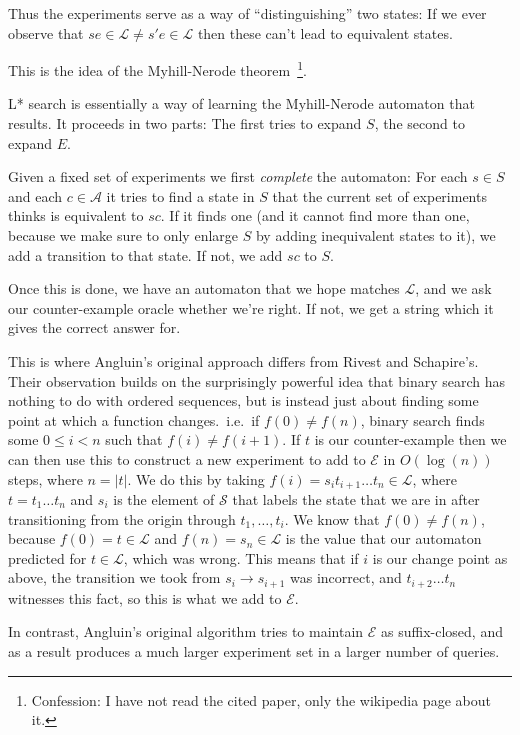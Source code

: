 \documentclass[a4paper]{article}
\begin{document}
Thus the experiments serve as a way of ``distinguishing'' two states:
If we ever observe that \(se \in \mathcal{L} \neq s'e \in \mathcal{L}\) then these can't lead to equivalent states.

This is the idea of the Myhill-Nerode theorem~\cite{nerode1958linear}\footnote{Confession:
I have not read the cited paper,
only the wikipedia page about it.
}.

L* search is essentially a way of learning the Myhill-Nerode automaton that results.
It proceeds in two parts:
The first tries to expand \(S\),
the second to expand \(E\).

Given a fixed set of experiments we first \emph{complete} the automaton:
For each \(s \in S\) and each \(c \in \mathcal{A}\) it tries to find a state in \(S\) that the current set of experiments thinks is equivalent to \(sc\).
If it finds one (and it cannot find more than one,
because we make sure to only enlarge \(S\) by adding inequivalent states to it),
we add a transition to that state.
If not,
we add \(sc\) to \(S\).

Once this is done,
we have an automaton that we hope matches \(\mathcal{L}\),
and we ask our counter-example oracle whether we're right.
If not,
we get a string which it gives the correct answer for.

This is where Angluin's original approach differs from Rivest and Schapire's.
Their observation builds on the surprisingly powerful idea that binary search has nothing to do with ordered sequences,
but is instead just about finding some point at which a function changes.\ 
i.e.\ if \(f(0) \neq f(n)\),
binary search finds some \(0 \leq i < n\) such that \(f(i) \neq f(i + 1)\).
If \(t\) is our counter-example then we can then use this to construct a new experiment to add to \(\mathcal{E}\) in \(O(\log(n))\) steps,
where \(n = |t|\).
We do this by taking \(f(i) = s_i t_{i+1} \ldots t_{n} \in \mathcal{L}\),
where \(t = t_1 \ldots t_n\) and \(s_i\) is the element of \(\mathcal{S}\) that labels the state that we are in after transitioning from the origin through
\(t_1, \ldots, t_i\).
We know that \(f(0) \neq f(n)\),
because \(f(0) = t \in \mathcal{L}\) and \(f(n) = s_n \in \mathcal{L}\) is the value that our automaton predicted for \(t \in \mathcal{L}\),
which was wrong.
This means that if \(i\) is our change point as above,
the transition we took from \(s_i \to s_{i + 1}\) was incorrect,
and \(t_{i + 2} \ldots t_n\) witnesses this fact,
so this is what we add to \(\mathcal{E}\).

In contrast,
Angluin's original algorithm tries to maintain \(\mathcal{E}\) as suffix-closed,
and as a result produces a much larger experiment set in a larger number of queries.
\end{document}
